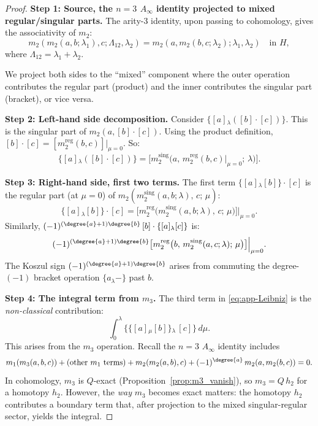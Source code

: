 \begin{proof}
\textbf{Step 1: Source, the $n=3$ $A_\infty$ identity projected to mixed regular/singular parts.}
The arity-3 identity, upon passing to cohomology, gives the associativity of $m_2$:
\[
m_2(m_2(a,b;\lambda_1),c;\Lambda_{12},\lambda_2) = m_2(a,m_2(b,c;\lambda_2);\lambda_1,\lambda_2) \quad\text{in }H,
\]
where $\Lambda_{12} = \lambda_1 + \lambda_2$.

We project both sides to the ``mixed'' component where the outer operation contributes the regular part (product) and the inner contributes the singular part (bracket), or vice versa.

\textbf{Step 2: Left-hand side decomposition.}
Consider $\{[a]{}_\lambda ([b]\cdot [c])\}$. This is the singular part of $m_2(a, [b]\cdot[c])$. Using the product definition, $[b]\cdot[c] = [m_2^{\mathrm{reg}}(b,c)]\big|_{\mu=0}$. So:
\[
\{[a]{}_\lambda ([b]\cdot [c])\} = \bigl[m_2^{\mathrm{sing}}\bigl(a,\, m_2^{\mathrm{reg}}(b,c)\big|_{\mu=0};\,\lambda\bigr)\bigr].
\]

\textbf{Step 3: Right-hand side, first two terms.}
The first term $\{[a]{}_\lambda [b]\}\cdot [c]$ is the regular part (at $\mu = 0$) of $m_2(m_2^{\mathrm{sing}}(a,b;\lambda),\, c;\, \mu)$:
\[
\{[a]{}_\lambda [b]\}\cdot [c] = \bigl[m_2^{\mathrm{reg}}\bigl(m_2^{\mathrm{sing}}(a,b;\lambda),\, c;\, \mu\bigr)\bigr]\Big|_{\mu=0}.
\]
Similarly, $(-1)^{(\degree{a}+1)\degree{b}}\,[b]\cdot\{[a]{}_\lambda [c]\}$ is:
\[
(-1)^{(\degree{a}+1)\degree{b}}\bigl[m_2^{\mathrm{reg}}\bigl(b,\, m_2^{\mathrm{sing}}(a,c;\lambda);\, \mu\bigr)\bigr]\Big|_{\mu=0}.
\]
The Koszul sign $(-1)^{(\degree{a}+1)\degree{b}}$ arises from commuting the degree-$(-1)$ bracket operation $\{a{}_\lambda -\}$ past $b$.

\textbf{Step 4: The integral term from $m_3$.}
The third term in \eqref{eq:app-Leibniz} is the \emph{non-classical} contribution:
\[
\int_0^\lambda \{\{[a]{}_\mu [b]\}{}_\lambda\, [c]\}\,d\mu.
\]
This arises from the $m_3$ operation. Recall the $n=3$ $A_\infty$ identity includes
\[
m_1(m_3(a,b,c)) + \text{(other $m_1$ terms)} + m_2(m_2(a,b),c) + (-1)^{\degree{a}}\,m_2(a,m_2(b,c)) = 0.
\]
In cohomology, $m_3$ is $Q$-exact (Proposition~\ref{prop:m3_vanish}), so $m_3 = Q\,h_2$ for a homotopy $h_2$. However, the \emph{way} $m_3$ becomes exact matters: the homotopy $h_2$ contributes a boundary term that, after projection to the mixed singular-regular sector, yields the integral.


\end{proof}
